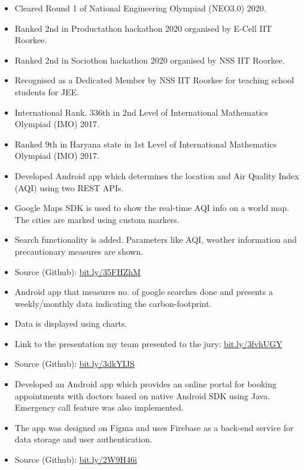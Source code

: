 


\begin{itemize}
\item Cleared Round 1 of National Engineering Olympiad (NEO3.0) 2020.
\item Ranked 2nd in Productathon hackathon 2020 organised by E-Cell IIT Roorkee.
\item Ranked 2nd in Sociothon hackathon 2020 organised by NSS IIT Roorkee.
\item Recognised as a Dedicated Member by NSS IIT Roorkee for teaching school students for JEE.
\item International Rank. 336th in 2nd Level of International Mathematics Olympiad (IMO) 2017.
\item Ranked 9th in Haryana state in 1st Level of International Mathematics Olympiad (IMO) 2017.
\end{itemize}





\begin{itemize}
\item Developed Android app which determines the location and Air Quality Index (AQI) using two REST APIs.
\item Google Maps SDK is used to show the real-time AQI info on a world map. The cities are marked using custom markers.
\item Search functionality is added. Parameters like AQI, weather information and precautionary measures are shown.
\item Source (Github): \href{https://bit.ly/35FHZhM}{bit.ly/35FHZhM}
\end{itemize}

\begin{itemize}
\item Android app that measures no. of google searches done and presents a weekly/monthly data indicating the carbon-footprint.
\item Data is displayed using charts.
\item Link to the presentation my team presented to the jury: \href{https://bit.ly/3fvhUGY}{bit.ly/3fvhUGY}
\item Source (Github): \href{https://bit.ly/3dkYIJS}{bit.ly/3dkYIJS}
\end{itemize}

\begin{itemize}
\item Developed an Android app which provides an online portal for booking appointments with doctors based on native
Android SDK using Java. Emergency call feature was also implemented.
\item The app was designed on Figma and uses Firebase as a back-end service for data storage and user authentication.
\item Source (Github): \href{https://bit.ly/2W9H46i}{bit.ly/2W9H46i}
\end{itemize}




